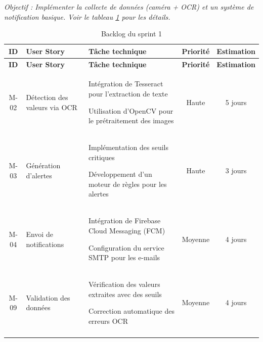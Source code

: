 \newcommand{\seprule}{%
  \par
  \vspace{\dimeval{-\ht\strutbox}}%
  \makebox[5.5cm]{\rule{\dimeval{5.5cm+2\tabcolsep}}{0.4pt}}%
  \vspace{\dimeval{-\dp\strutbox+\extrarowheight}}%
  \par
}

\renewcommand{\arraystretch}{1.3} %
\setlength{\extrarowheight}{0.75mm} %

\textit{Objectif : Implémenter la collecte de données (caméra + OCR) et un système de notification basique. Voir le tableau \ref{tab:backlog_sprint1} pour les détails.}

\begin{longtable}{|c|p{3cm}|p{5.5cm}|c|c|}
    \hline
    \textbf{ID} & \textbf{User Story} & \textbf{Tâche technique} & \textbf{Priorité} & \textbf{Estimation} \tabularnewline
    \hline
    \endfirsthead
    \hline
    \textbf{ID} & \textbf{User Story} & \textbf{Tâche technique} & \textbf{Priorité} & \textbf{Estimation} \tabularnewline
    \hline
    \endhead
    \endfoot
    M-02 & Détection des valeurs via OCR & 
       Intégration de Tesseract pour l'extraction de texte 
       \seprule
       Utilisation d'OpenCV pour le prétraitement des images 
     & Haute & 5 jours \tabularnewline
    \hline
    M-03 & Génération d’alertes & 
       Implémentation des seuils critiques 
       \seprule
       Développement d’un moteur de règles pour les alertes 
     & Haute & 3 jours \tabularnewline
    \hline
    M-04 & Envoi de notifications & 
       Intégration de Firebase Cloud Messaging (FCM) 
       \seprule
       Configuration du service SMTP pour les e-mails 
     & Moyenne & 4 jours \tabularnewline
    \hline
    M-09 & Validation des données & 
       Vérification des valeurs extraites avec des seuils 
       \seprule
       Correction automatique des erreurs OCR 
     & Moyenne & 4 jours \tabularnewline
    \hline
    \caption{Backlog du sprint 1}
    \label{tab:backlog_sprint1} %
\end{longtable}